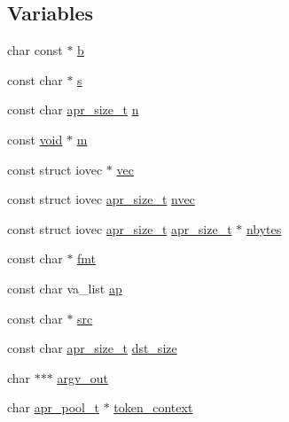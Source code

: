 \subsection*{Variables}
\begin{DoxyCompactItemize}
\item 
char const $\ast$ \hyperlink{group__apr__strings_gaaeb2d24214b074159a93265bf71b1841}{b}
\item 
const char $\ast$ \hyperlink{group__apr__strings_gab87f55bd0280d90925050a4188c14ab5}{s}
\item 
const char \hyperlink{group__apr__platform_gaaa72b2253f6f3032cefea5712a27540e}{apr\+\_\+size\+\_\+t} \hyperlink{group__apr__strings_ga29292afc9d0df52b211c0309dd65f20e}{n}
\item 
const \hyperlink{group__MOD__ISAPI_gacd6cdbf73df3d9eed42fa493d9b621a6}{void} $\ast$ \hyperlink{group__apr__strings_gacb57d1edb8c39faf512f51b83b431cc4}{m}
\item 
const struct iovec $\ast$ \hyperlink{group__apr__strings_gaf648625d9c46feb42d2ff877624b0e55}{vec}
\item 
const struct iovec \hyperlink{group__apr__platform_gaaa72b2253f6f3032cefea5712a27540e}{apr\+\_\+size\+\_\+t} \hyperlink{group__apr__strings_gacb23e6e628f47db01b56c8cbc43a45f1}{nvec}
\item 
const struct iovec \hyperlink{group__apr__platform_gaaa72b2253f6f3032cefea5712a27540e}{apr\+\_\+size\+\_\+t} \hyperlink{group__apr__platform_gaaa72b2253f6f3032cefea5712a27540e}{apr\+\_\+size\+\_\+t} $\ast$ \hyperlink{group__apr__strings_gaf0c13da0f13a4ee51a11fd8ab1a5213c}{nbytes}
\item 
const char $\ast$ \hyperlink{group__apr__strings_ga381d684d94e6e91dee650357e8f02fa8}{fmt}
\item 
const char va\+\_\+list \hyperlink{group__apr__strings_ga21ecbc810cd93b85a818c96ca2f92f1a}{ap}
\item 
const char $\ast$ \hyperlink{group__apr__strings_gaf51e37c9331049b1e3d250a7c8bc3c26}{src}
\item 
const char \hyperlink{group__apr__platform_gaaa72b2253f6f3032cefea5712a27540e}{apr\+\_\+size\+\_\+t} \hyperlink{group__apr__strings_ga001fd9d21d94858ab2b3358fb9ced2c0}{dst\+\_\+size}
\item 
char $\ast$$\ast$$\ast$ \hyperlink{group__apr__strings_gaf6c5fef3e228783f7e8da6571bfc7a92}{argv\+\_\+out}
\item 
char \hyperlink{structapr__pool__t}{apr\+\_\+pool\+\_\+t} $\ast$ \hyperlink{group__apr__strings_gaaa008198151b382d5643a593d4a3a630}{token\+\_\+context}

\end{DoxyCompactItemize}
